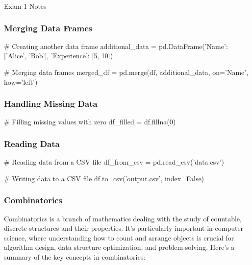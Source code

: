 \begin{examnotes}{Exam 1 Notes}
\begin{highlight}
        \subsubsection*{Merging Data Frames}

    \begin{code}[Python]
    # Creating another data frame
    additional_data = pd.DataFrame({'Name': ['Alice', 'Bob'], 'Experience': [5, 10]})
    
    # Merging data frames
    merged_df = pd.merge(df, additional_data, on='Name', how='left')        
    \end{code}

        \subsubsection*{Handling Missing Data}

    \begin{code}[Python]
    # Filling missing values with zero
    df_filled = df.fillna(0)        
    \end{code}

        \subsubsection*{Reading Data}

    \begin{code}[Python]
    # Reading data from a CSV file
    df_from_csv = pd.read_csv('data.csv')
    
    # Writing data to a CSV file
    df.to_csv('output.csv', index=False)        
    \end{code}
    \end{highlight}

    \subsubsection*{Combinatorics}

    Combinatorics is a branch of mathematics dealing with the study of countable, discrete structures and their properties. It's particularly important in computer science, where understanding how to 
    count and arrange objects is crucial for algorithm design, data structure optimization, and problem-solving. Here's a summary of the key concepts in combinatorics:


\end{examnotes}
